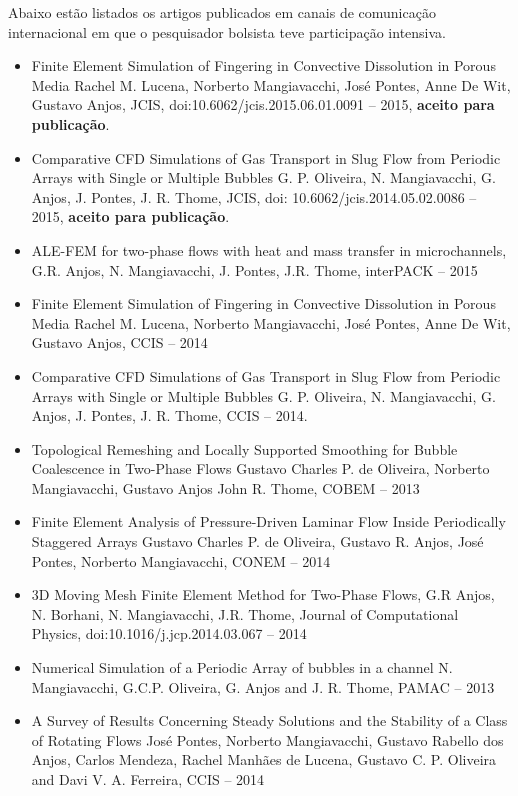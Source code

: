 \documentclass[a4paper,portuges,12pt]{article}
\begin{document}
Abaixo estão listados os artigos publicados em canais de comunicação
internacional em que o pesquisador bolsista teve participação intensiva.

\begin{itemize}
	\item Finite Element Simulation of Fingering in Convective Dissolution in
		  Porous Media Rachel M. Lucena, Norberto Mangiavacchi, José
		  Pontes, Anne De Wit, Gustavo Anjos, JCIS,
		  doi:10.6062/jcis.2015.06.01.0091 -- 2015, \textbf{aceito para
		  publicação}.
	\item Comparative CFD Simulations of Gas Transport in Slug Flow from
		  Periodic Arrays with Single or Multiple Bubbles G. P.
		  Oliveira, N. Mangiavacchi, G. Anjos, J. Pontes, J. R. Thome,
		  JCIS, doi: 10.6062/jcis.2014.05.02.0086 -- 2015,
		  \textbf{aceito para publicação}.
	\item ALE-FEM for two-phase flows with heat and mass transfer in
	      microchannels, G.R. Anjos, N. Mangiavacchi, J. Pontes, J.R. Thome,
		  interPACK -- 2015
	\item Finite Element Simulation of Fingering in Convective Dissolution in
	      Porous Media Rachel M. Lucena, Norberto Mangiavacchi, José Pontes,
	      Anne De Wit, Gustavo Anjos, CCIS -- 2014
	\item Comparative CFD Simulations of Gas Transport in Slug Flow from
		  Periodic Arrays with Single or Multiple Bubbles G. P.
		  Oliveira, N. Mangiavacchi, G. Anjos, J. Pontes, J. R. Thome,
		  CCIS -- 2014.
	\item Topological Remeshing and Locally Supported Smoothing for
	      Bubble Coalescence in Two-Phase Flows
		  Gustavo Charles P. de Oliveira, Norberto Mangiavacchi, Gustavo Anjos
		  John R. Thome, COBEM -- 2013
	\item Finite Element Analysis of Pressure-Driven Laminar Flow Inside
	      Periodically Staggered Arrays
		  Gustavo Charles P. de Oliveira, Gustavo R. Anjos, José Pontes,
		  Norberto Mangiavacchi, CONEM -- 2014
	\item 3D Moving Mesh Finite Element Method for Two-Phase Flows, G.R
	      Anjos, N. Borhani, N.  Mangiavacchi, J.R. Thome,  Journal of
		  Computational Physics, doi:10.1016/j.jcp.2014.03.067 -- 2014
	\item Numerical Simulation of a Periodic Array of bubbles in a
		  channel N. Mangiavacchi, G.C.P. Oliveira, G. Anjos and J. R.
		  Thome, PAMAC -- 2013
	\item A Survey of Results Concerning Steady Solutions and the
	      Stability of a Class of Rotating Flows
		  José Pontes, Norberto Mangiavacchi, Gustavo Rabello dos Anjos,
		  Carlos Mendeza, Rachel Manhães de Lucena, Gustavo C. P.
		  Oliveira and Davi V. A. Ferreira, CCIS -- 2014
\end{itemize}
\end{document}

